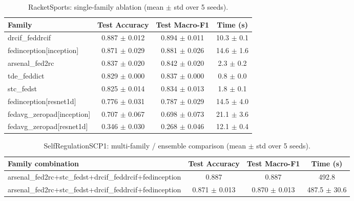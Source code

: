 \begin{table}[t]
\centering
\caption{RacketSports: single-family ablation (mean $\pm$ std over 5 seeds).}
\label{tab:results_racketsports_ablation}
\begin{tabular}{lccc}
\toprule
Family & Test Accuracy & Test Macro-F1 & Time (s) \\
\midrule
drcif\_feddrcif & 0.887 $\pm$ 0.012 & 0.894 $\pm$ 0.011 & 10.3 $\pm$ 0.1 \\
fedinception[inception] & 0.871 $\pm$ 0.029 & 0.881 $\pm$ 0.026 & 14.6 $\pm$ 1.6 \\
arsenal\_fed2rc & 0.837 $\pm$ 0.020 & 0.842 $\pm$ 0.020 & 2.3 $\pm$ 0.2 \\
tde\_feddict & 0.829 $\pm$ 0.000 & 0.837 $\pm$ 0.000 & 0.8 $\pm$ 0.0 \\
stc\_fedst & 0.825 $\pm$ 0.014 & 0.834 $\pm$ 0.013 & 1.8 $\pm$ 0.1 \\
fedinception[resnet1d] & 0.776 $\pm$ 0.031 & 0.787 $\pm$ 0.029 & 14.5 $\pm$ 4.0 \\
fedavg\_zeropad[inception] & 0.707 $\pm$ 0.067 & 0.698 $\pm$ 0.073 & 21.1 $\pm$ 3.6 \\
fedavg\_zeropad[resnet1d] & 0.346 $\pm$ 0.030 & 0.268 $\pm$ 0.046 & 12.1 $\pm$ 0.4 \\
\bottomrule
\end{tabular}
\end{table}

\begin{table}[t]
\centering
\caption{SelfRegulationSCP1: multi-family / ensemble comparison (mean $\pm$ std over 5 seeds).}
\label{tab:results_selfregulationscp1_ensemble}
\begin{tabular}{lccc}
\toprule
Family combination & Test Accuracy & Test Macro-F1 & Time (s) \\
\midrule
arsenal\_fed2rc+stc\_fedst+drcif\_feddrcif+fedinception & 0.887 & 0.887 & 492.8 \\
arsenal\_fed2rc+stc\_fedst+drcif\_feddrcif+fedinception & 0.871 $\pm$ 0.013 & 0.870 $\pm$ 0.013 & 487.5 $\pm$ 30.6 \\
\bottomrule
\end{tabular}
\end{table}

